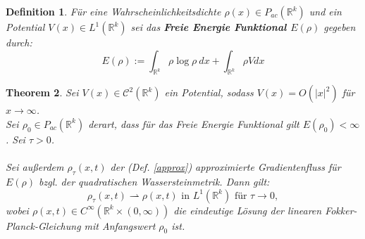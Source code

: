 \documentclass[11pt,a4paper,notitlepage]{scrreprt}
\newcommand{\RR}{\mathbb{R}}
\newtheorem{defi}{Definition}[section]
\newtheorem{theorem}[defi]{Theorem}
\begin{document}
\begin{defi}
Für eine Wahrscheinlichkeitsdichte $\rho(x)\in P_{ac}(\RR^k)$ und ein Potential $V(x)\in L^1(\RR^k)$ sei das \textbf{Freie Energie Funktional $E(\rho)$} gegeben durch:
\begin{equation}
E(\rho):=\int_{\RR^k} \rho\log\rho~ dx + \int_{\RR^k}\rho V dx \label{FEFktn}
\end{equation}
\end{defi}
\vspace{10pt}


\begin{theorem}
Sei $V(x)\in \mathcal{C}^2(\RR^k)$ ein Potential, sodass $V(x)=O(\vert x \vert^2)$ für $x\to\infty$. \\
Sei $\rho_0\in P_{ac}(\RR^k)$ derart, dass für das Freie Energie Funktional gilt $E(\rho_0)<\infty$. Sei $\tau>0$.\\\\
Sei außerdem $\rho_\tau(x,t)$ der (Def. \ref{approx}) approximierte Gradientenfluss für $E(\rho)$ bzgl. der quadratischen Wassersteinmetrik. 
Dann gilt: \\
\begin{equation*}
\rho_\tau(x,t)\rightharpoonup \rho(x,t) \text{ in } L^1(\RR^k) \text{ für } \tau\to 0,
\end{equation*}
wobei $\rho(x,t)\in C^\infty(\RR^k\times(0,\infty))$ die eindeutige Lösung der linearen Fokker-Planck-Gleichung mit Anfangswert $\rho_0$ ist. 
\end{theorem}
\end{document}
